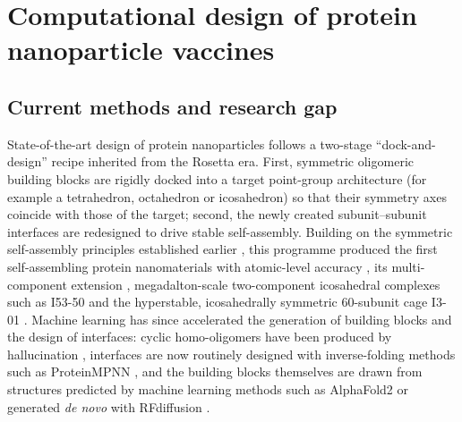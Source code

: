 \chapter{Computational design of protein nanoparticle vaccines}
\label{ch:comp-design}


\section{Current methods and research gap}
\label{sec:current-methods}

State-of-the-art design of protein nanoparticles follows a two-stage
``dock-and-design'' recipe inherited from the Rosetta era. First, symmetric
oligomeric building blocks are rigidly docked into a target point-group
architecture (for example a tetrahedron, octahedron or icosahedron) so that their
symmetry axes coincide with those of the target; second, the newly created
subunit--subunit interfaces are redesigned to drive stable self-assembly.
Building on the symmetric self-assembly principles established earlier
\parencite{padilla_nanohedra_2001}, this programme produced the first
self-assembling protein nanomaterials with atomic-level accuracy
\parencite{king_computational_2012}, its multi-component extension
\parencite{king_accurate_2014}, megadalton-scale two-component icosahedral
complexes such as I53-50 \parencite{bale_accurate_2016} and the hyperstable,
icosahedrally symmetric 60-subunit cage I3-01 \parencite{hsia_design_2016}. Machine learning has
since accelerated the generation of building blocks and the design of interfaces:
cyclic homo-oligomers have been produced by hallucination
\parencite[e.g.][]{wickyHallucinatingSymmetricProtein2022}, interfaces are now
routinely designed with inverse-folding methods such as ProteinMPNN
\parencite{de_haas_rapid_2024}, and the building blocks themselves are drawn from
structures predicted by machine learning methods such as AlphaFold2
\parencite{haas_sequence_2025} or generated \emph{de novo} with RFdiffusion
\parencite{haas_novo_2026}.

